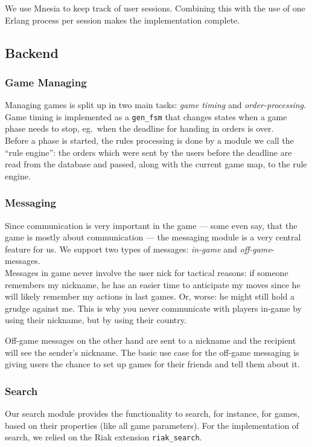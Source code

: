\documentclass[11pt,a4paper]{report}
\begin{document}
We use Mnesia to keep track of user sessions. Combining this with
the use of one Erlang process per session makes the implementation complete.


\subsection{Backend}
\subsubsection{Game Managing}
Managing games is split up in two main tasks: {\em game timing\/} and
{\em order-processing}. \\
Game timing is implemented as a {\tt gen\_fsm} that changes states when a game
phase needs to stop, eg.\ when the deadline for handing in orders is over.\\
Before a phase is started, the rules processing is done by a module we call
the ``rule engine'': the orders which were sent by the users before the
deadline are read from the database and passed, along with the current game
map, to the rule engine.
\subsubsection{Messaging}
Since communication is very important in the game --- some even say, that the
game is mostly about communication --- the messaging module is a very central
feature for us. We support two types of messages: {\em in-game\/} and
{\em off-game\/}-messages.\\
Messages in game never involve the user nick for tactical reasons: if someone
remembers my nickname, he has an easier time to anticipate my moves since he
will likely remember my actions in last games.
Or, worse: he might still hold a grudge against me. This is why you never
communicate with players in-game by using their nickname, but by using their
country.

Off-game messages on the other hand are sent to a nickname and the recipient
will see the sender's nickname. The basic use case for the off-game messaging
is giving users the chance to set up games for their friends and tell them
about it.
\subsubsection{Search}
Our search module provides the functionality to search, for instance, for
games, based on their properties (like all game parameters). For the
implementation of search, we relied on the Riak extension {\tt riak\_search}.
\end{document}
